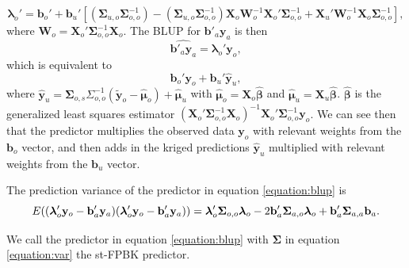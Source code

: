 \documentclass[]{interact}
\theoremstyle{plain}%
\theoremstyle{definition}
\theoremstyle{remark}
\begin{document}
\begin{equation}
\bm{\lambda}_o' = \mathbf{b}_{o}' + \mathbf{b}_{u}'\left[ (\bm{\Sigma}_{u, o}\bm{\Sigma}_{o, o}^{-1}) - (\bm{\Sigma}_{u, o} \bm{\Sigma}_{o, o}^{-1})\mathbf{X}_o\mathbf{W}_o^{-1}\mathbf{X}_o'\bm{\Sigma}_{o, o}^{-1} + \mathbf{X}_{u}'\mathbf{W}_o^{-1}\mathbf{X}_o \bm{\Sigma}_{o, o}^{-1} \right],
\end{equation} \noindent where
\(\mathbf{W}_o = \mathbf{X}_o'\bm{\Sigma}_{o, o}^{-1}\mathbf{X}_o\). The
BLUP for \(\mathbf{b}'_a \mathbf{y}_a\) is then \mbox{}
\begin{equation} \label{equation:blup}
\widehat{\mathbf{b}'_a \mathbf{y}_a} = \bm{\lambda}_o' \mathbf{y}_o,
\end{equation} \noindent which is equivalent to \mbox{}
\begin{equation*}
\mathbf{b}_{o}'\mathbf{y}_{o} + \mathbf{b}_{u}' \mathbf{\hat{y}}_{u},
\end{equation*} \noindent where
\(\mathbf{\hat{y}}_{u} = \bm{\Sigma}_{o, s} \Sigma_{o, o}^{-1} (\mathbf{\tilde{y}}_o - \bm{\hat{\mu}}_o) + \bm{\hat{\mu}}_u\)
with \(\bm{\hat{\mu}}_o = \mathbf{X}_o \bm{\hat{\beta}}\) and
\(\bm{\hat{\mu}}_u = \mathbf{X}_u \bm{\hat{\beta}}\).
\(\bm{\hat{\beta}}\) is the generalized least squares estimator
\((\mathbf{X}_o' \bm{\Sigma}_{o, o}^{-1} \mathbf{X}_o)^{-1} \mathbf{X}_o' \bm{\Sigma}_{o, o}^{-1} \mathbf{y}_o\).
We can see then that the predictor multiplies the observed data
\(\mathbf{y}_o\) with relevant weights from the \(\mathbf{b}_o\) vector,
and then adds in the kriged predictions \(\mathbf{\hat{y}}_{u}\)
multiplied with relevant weights from the \(\mathbf{b}_u\) vector.

The prediction variance of the predictor in equation \ref{equation:blup}
is \mbox{} \begin{equation} \label{equation:predvar}
E((\bm{\lambda}_o'\mathbf{y}_o - \mathbf{b}_a'\mathbf{y}_a)(\bm{\lambda}_o'\mathbf{y}_o - \mathbf{b}_a'\mathbf{y}_a)) = \\
\bm{\lambda}_o'\bm{\Sigma}_{o, o}\bm{\lambda}_o - 2 \mathbf{b}_a' \bm{\Sigma}_{a, o} \bm{\lambda}_o + \mathbf{b}_a' \bm{\Sigma}_{a, a} \mathbf{b}_a.
\end{equation}

\noindent We call the predictor in equation \ref{equation:blup} with
\(\bm{\Sigma}\) in equation \ref{equation:var} the st-FPBK predictor.
\end{document}
